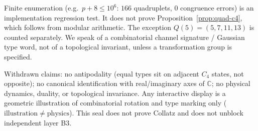 \begin{remark}
Finite enumeration (e.g.\ \(p+8\le 10^6\): \(166\) quadruplets, \(0\) congruence
errors) is an implementation regression test. It does not prove
Proposition~\ref{prop:quad-c4}, which follows from modular arithmetic.
The exception \(Q(5)=(5,7,11,13)\) is counted separately.
We speak of a combinatorial channel signature / Gaussian type word, not of a
topological invariant, unless a transformation group is specified.

Withdrawn claims: no antipodality (equal types sit on adjacent \(C_4\) states,
not opposite); no canonical identification with real/imaginary axes of
\(\mathbb{C}\); no physical dynamics, duality, or topological invariance.
Any interactive display is a geometric illustration of combinatorial rotation
and type marking only (\(\mathrm{illustration}\neq\mathrm{physics}\)).
This seal does not prove Collatz and does not unblock independent layer B3.
\end{remark}
